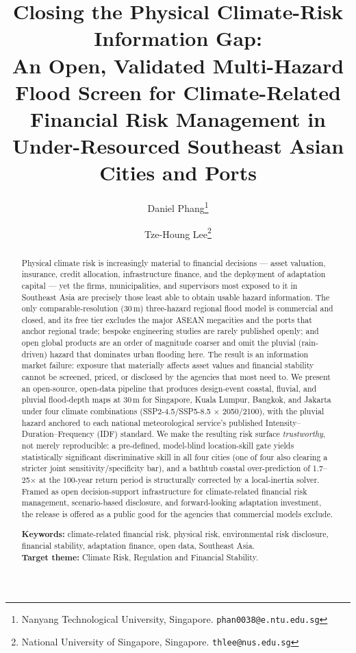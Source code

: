 \documentclass[11pt,a4paper]{article}
\title{\textbf{Closing the Physical Climate-Risk Information Gap:\\
An Open, Validated Multi-Hazard Flood Screen for Climate-Related\\
Financial Risk Management in Under-Resourced Southeast Asian Cities and Ports}}
\author{Daniel Phang\thanks{Nanyang Technological University, Singapore. \texttt{phan0038@e.ntu.edu.sg}}
\and Tze-Houng Lee\thanks{National University of Singapore, Singapore. \texttt{thlee@nus.edu.sg}}}
\date{}
\begin{document}
\maketitle

\begin{abstract}
\noindent Physical climate risk is increasingly material to financial decisions --- asset valuation, insurance, credit allocation, infrastructure finance, and the deployment of adaptation capital --- yet the firms, municipalities, and supervisors most exposed to it in Southeast Asia are precisely those least able to obtain usable hazard information. The only comparable-resolution (30\,m) three-hazard regional flood model is commercial and closed, and its free tier excludes the major ASEAN megacities and the ports that anchor regional trade; bespoke engineering studies are rarely published openly; and open global products are an order of magnitude coarser and omit the pluvial (rain-driven) hazard that dominates urban flooding here. The result is an information market failure: exposure that materially affects asset values and financial stability cannot be screened, priced, or disclosed by the agencies that most need to. We present an open-source, open-data pipeline that produces design-event coastal, fluvial, and pluvial flood-depth maps at 30\,m for Singapore, Kuala Lumpur, Bangkok, and Jakarta under four climate combinations (SSP2-4.5/SSP5-8.5 $\times$ 2050/2100), with the pluvial hazard anchored to each national meteorological service's published Intensity--Duration--Frequency (IDF) standard. We make the resulting risk surface \emph{trustworthy}, not merely reproducible: a pre-defined, model-blind location-skill gate yields statistically significant discriminative skill in all four cities (one of four also clearing a stricter joint sensitivity/specificity bar), and a bathtub coastal over-prediction of 1.7--25$\times$ at the 100-year return period is structurally corrected by a local-inertia solver. Framed as open decision-support infrastructure for climate-related financial risk management, scenario-based disclosure, and forward-looking adaptation investment, the release is offered as a public good for the agencies that commercial models exclude.

\medskip
\noindent\textbf{Keywords:} climate-related financial risk, physical risk, environmental risk disclosure, financial stability, adaptation finance, open data, Southeast Asia.\\
\noindent\textbf{Target theme:} Climate Risk, Regulation and Financial Stability.
\end{abstract}
\end{document}
